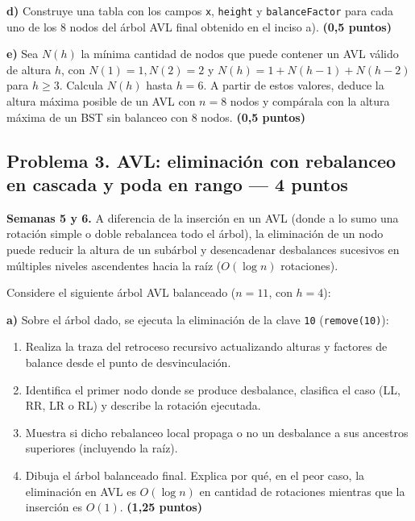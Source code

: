 \documentclass[10pt,a4paper]{article}
\newcommand{\pts}[1]{\textbf{(#1)}}
\begin{document}
\textbf{d)} Construye una tabla con los campos \texttt{x}, \texttt{height} y \texttt{balanceFactor} para cada uno de los 8 nodos del árbol AVL final obtenido en el inciso a). \pts{0,5 puntos}

\textbf{e)} Sea $N(h)$ la mínima cantidad de nodos que puede contener un AVL válido de altura $h$, con $N(1) = 1, N(2) = 2$ y $N(h) = 1 + N(h-1) + N(h-2)$ para $h \ge 3$. Calcula $N(h)$ hasta $h = 6$. A partir de estos valores, deduce la altura máxima posible de un AVL con $n = 8$ nodos y compárala con la altura máxima de un BST sin balanceo con 8 nodos. \pts{0,5 puntos}

\newpage
\subsection*{Problema 3. AVL: eliminación con rebalanceo en cascada y poda en rango --- 4 puntos}

\footnotesize
\textbf{Semanas 5 y 6.} A diferencia de la inserción en un AVL (donde a lo sumo una rotación simple o doble rebalancea todo el árbol), la eliminación de un nodo puede reducir la altura de un subárbol y desencadenar desbalances sucesivos en múltiples niveles ascendentes hacia la raíz ($O(\log n)$ rotaciones).

Considere el siguiente árbol AVL balanceado ($n = 11$, con $h = 4$):

\begin{center}
\end{center}

\textbf{a)} Sobre el árbol dado, se ejecuta la eliminación de la clave \texttt{10} (\texttt{remove(10)}):
\begin{enumerate}[label=\roman*.,itemsep=1pt]
\item Realiza la traza del retroceso recursivo actualizando alturas y factores de balance desde el punto de desvinculación.
\item Identifica el primer nodo donde se produce desbalance, clasifica el caso (LL, RR, LR o RL) y describe la rotación ejecutada.
\item Muestra si dicho rebalanceo local propaga o no un desbalance a sus ancestros superiores (incluyendo la raíz).
\item Dibuja el árbol balanceado final. Explica por qué, en el peor caso, la eliminación en AVL es $O(\log n)$ en cantidad de rotaciones mientras que la inserción es $O(1)$. \pts{1,25 puntos}
\end{enumerate}
\end{document}
